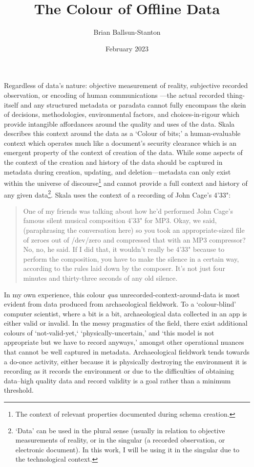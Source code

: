 \documentclass{scrarticle}
\title{The Colour of Offline Data}
\author{Brian Ballsun-Stanton}
\date{February 2023}
\begin{document}
\maketitle
{}




Regardless of data's nature: objective measurement of reality, subjective recorded observation, or encoding of human communications \parencite{Ballsun-Stanton2010-cn}---the actual recorded thing-itself and any structured metadata or paradata 
cannot fully encompass the skein of decisions, methodologies, environmental factors, and choices-in-rigour which provide intangible affordances around the quality and uses of the data. Skala describes this context around the data as a `Colour of bits;' a human-evaluable context which operates much like a document's security clearance which is an emergent property of the context of creation of the data\parencite*{Skala2004-zc}. While some aspects of the context of the creation and history of the data should be captured in metadata during creation, updating, and deletion---metadata can only exist within the universe of discourse\footnote{The context of relevant properties documented during schema creation.
} and cannot provide a full context and history of any given data\footnote{`Data' can be used in the plural sense (usually in relation to objective measurements of reality, or in the singular (a recorded observation, or electronic document). In this work, I will be using it in the singular due to the technological context.}. Skala uses the context of a recording of John Cage's 4'33":
\begin{quote}
One of my friends was talking about how he'd performed John Cage's famous silent musical composition 4'33" for MP3.  Okay, we said, (paraphrasing the conversation here) so you took an appropriate-sized file of zeroes out of /dev/zero and compressed that with an MP3 compressor?  No, no, he said.  If I did that, it wouldn't really be 4'33" because to perform the composition, you have to make the silence in a certain way, according to the rules laid down by the composer.  It's not just four minutes and thirty-three seconds of any old silence. \parencite*{Skala2004-zc}
\end{quote}

In my own experience, this colour \textit{qua} unrecorded-context-around-data is most evident from data produced from archaeological fieldwork. To a `colour-blind' computer scientist, where a bit is a bit, archaeological data collected in an app is either valid or invalid. In the messy pragmatics of the field, there exist additional colours of `not-valid-yet,` `physically-uncertain,' and `this model is not appropriate but we have to record anyways,' amongst other operational nuances that cannot be well captured in metadata. Archaeological fieldwork tends towards a do-once activity, either because it is physically destroying the environment it is recording as it records the environment or due to the difficulties of obtaining data--high quality data and record validity is a goal rather than a minimum threshold.
\end{document}
